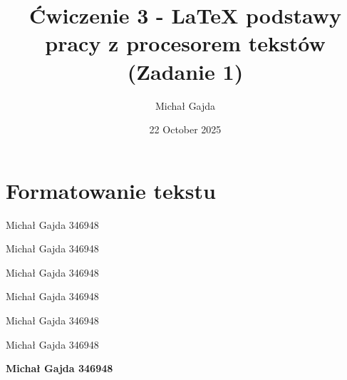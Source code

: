 \documentclass[12pt,a4paper]{article}
\title{Ćwiczenie 3 - LaTeX podstawy pracy z procesorem tekstów (Zadanie 1)}
\author{Michał Gajda}
\date{22 October 2025}
\begin{document}
\maketitle

\newpage
\section{Formatowanie tekstu}

\begin{center}
\lipsum[1]
\end{center}

\begin{center}
\lipsum[2]
\end{center}

\begin{center}
\lipsum[3]
\end{center}

\begin{center}
\lipsum[4]
\end{center}

\begin{flushright}
\lipsum[5]
\end{flushright}

\begin{flushright}
\lipsum[6]
\end{flushright}

\begin{flushright}
\lipsum[7]
\end{flushright}

\begin{flushleft}
\lipsum[8]
\end{flushleft}

\begin{flushleft}
\lipsum[9]
\end{flushleft}

\begin{flushleft}
\lipsum[10]
\end{flushleft}

{\tiny Michał Gajda 346948}

{\small Michał Gajda 346948}

{\normalsize Michał Gajda 346948}

{\large Michał Gajda 346948}

{\huge Michał Gajda 346948}

{\rmfamily Michał Gajda 346948} %

{\bfseries Michał Gajda 346948} %
\end{document}
